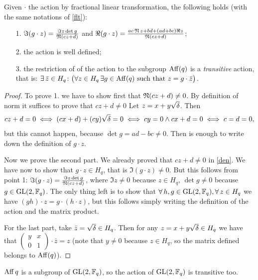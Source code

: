 \begin{prop}
Given $\cdot$ the action by fractional linear transformation, the following holds (with the same notations of \ref{flt}):
\begin{itemize}
\item[1.] $\Im (g\cdot z) = \frac{\Im z \det g}{\operatorname{\mathfrak{N}} (cz+d)}$ and
$\Re (g\cdot z) = \frac{ac\operatorname{\mathfrak{N}} z +bd+(ad+bc)\Re z}{\operatorname{\mathfrak{N}} (cz+d)}$;
\item[2.] the action is well defined;
\item[3.] the restriction of of the action to the subgroup $\operatorname{Aff} (q)$ is a {\it transitive} action, that is:
	$\exists \, \bar{z} \in H_q \colon \big( \forall z \in H_q\, \exists g \in \operatorname{Aff} (q)\,\,\text{such that}\,\, z=g \cdot \bar{z} \big) $. 
\end{itemize}
\begin{proof}
To prove 1. we have to show first that $\operatorname{\mathfrak{N}} (cz+d)\neq 0$. 
By definition of norm it suffices to prove that $cz+d \neq 0$  Let $z=x+y\sqrt{\delta}$. Then
\begin{equation}\label{den}
	cz+d=0 \iff (cx+d)+(cy)\sqrt{\delta}=0 \iff cy=0 \land cx+d=0 \iff c=d=0,
\end{equation}
but this cannot happen, because $\det g = ad-bc \neq 0$. Then is enough to write down the definition of $g\cdot z$.

Now we prove the second part. We already proved that $cz+d\neq 0$ in \ref{den}.
We have now to show that $g\cdot z \in H_q$, that is $\Im (g\cdot z)\neq 0$. But this follows from point 1:
$\Im (g\cdot z) = \frac{\Im z \det g}{\operatorname{\mathfrak{N}} (cz+d)}$, where $\Im z \neq 0$ because $z \in H_q$,
$\det g \neq 0$ because $g \in \operatorname{GL}(2,{\mathbb F}_q)$. The only thing left is to show that
$\forall \, h,g \in \operatorname{GL}(2,{\mathbb F}_q), \forall\, z \in H_q$ we have $(gh)\cdot z=g \cdot (h\cdot z)$, but this follows simply 
writing the definition of the action and the matrix product.

For the last part, take $\bar{z} = \sqrt{\delta} \in H_q$. Then for any $z=x+y\sqrt{\delta} \in H_q$ we have that $\begin{pmatrix} y & x \\ 0 & 1 \end{pmatrix} \cdot \bar{z} = z$ (note that $y\neq 0$ because $z \in H_q$, so the matrix defined belongs to $\operatorname{Aff} (q)$).
\end{proof}
\end{prop}
\begin{rem}
$\operatorname{Aff} q$ is a subgroup of $\operatorname{GL}(2,{\mathbb F}_q)$, so the action of $\operatorname{GL}(2,{\mathbb F}_q)$ is transitive too.
\end{rem}

